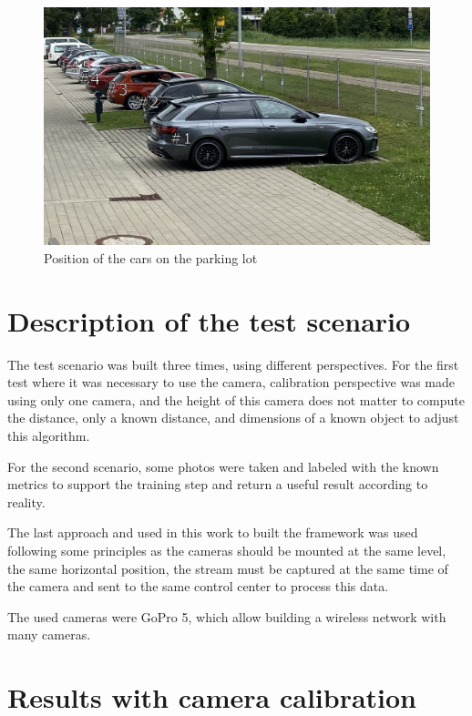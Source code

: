 \begin{figure}[H]
\centering
\includegraphics[scale=0.5]{imagens/park.JPG}
\caption{Position of the cars on the parking lot}
\label{fig:park}
\end{figure}

\section{Description of the test scenario}

The test scenario was built three times, using different perspectives. For the first test where it was necessary to use the camera, calibration perspective was made using only one camera, and the height of this camera does not matter to compute the distance, only a known distance, and dimensions of a known object to adjust this algorithm.

For the second scenario, some photos were taken and labeled with the known metrics to support the training step and return a useful result according to reality. 

The last approach and used in this work to built the framework was used following some principles as the cameras should be mounted at the same level, the same horizontal position,  the stream must be captured at the same time of the camera and sent to the same control center to process this data. 

The used cameras were GoPro 5, which allow building a wireless network with many cameras. 


\section{Results with camera calibration}

